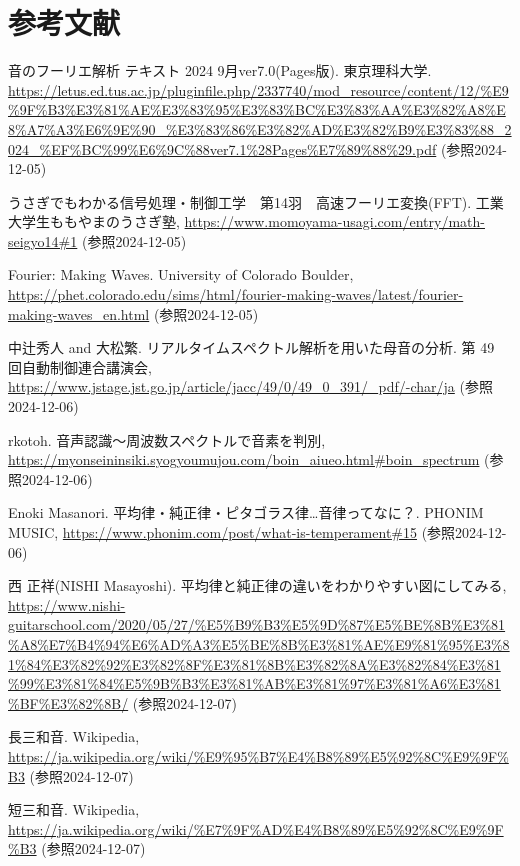 \documentclass{article}
\begin{document}
\section*{参考文献}
\begin{spacing}{1.4}
    \noindent
    [1] 音のフーリエ解析 テキスト 2024 9月ver7.0(Pages版). 東京理科大学.
    \url{https://letus.ed.tus.ac.jp/pluginfile.php/2337740/mod_resource/content/12/%E9%9F%B3%E3%81%AE%E3%83%95%E3%83%BC%E3%83%AA%E3%82%A8%E8%A7%A3%E6%9E%90_%E3%83%86%E3%82%AD%E3%82%B9%E3%83%88_2024_%EF%BC%99%E6%9C%88ver7.1%28Pages%E7%89%88%29.pdf}
    (参照2024-12-05)

    \noindent
    [2] うさぎでもわかる信号処理・制御工学　第14羽　高速フーリエ変換(FFT). 工業大学生ももやまのうさぎ塾,  
    \url{https://www.momoyama-usagi.com/entry/math-seigyo14#1}
    (参照2024-12-05)

    \noindent
    [3] Fourier: Making Waves. 
    University of Colorado Boulder,
    \url{https://phet.colorado.edu/sims/html/fourier-making-waves/latest/fourier-making-waves_en.html}
    (参照2024-12-05)

    \noindent
    [4] 中辻秀人 and 大松繁. リアルタイムスペクトル解析を用いた母音の分析. 第 49 回自動制御連合講演会,
    \url{https://www.jstage.jst.go.jp/article/jacc/49/0/49_0_391/_pdf/-char/ja}
    (参照2024-12-06)

    \noindent
    [5] rkotoh. 音声認識～周波数スペクトルで音素を判別, 
    \url{https://myonseininsiki.syogyoumujou.com/boin_aiueo.html#boin_spectrum}
    (参照2024-12-06)

    \noindent
    [6] Enoki Masanori. 平均律・純正律・ピタゴラス律…音律ってなに？. PHONIM MUSIC, 
    \url{https://www.phonim.com/post/what-is-temperament#15}
    (参照2024-12-06)

    \noindent
    [7] 西 正祥(NISHI Masayoshi). 平均律と純正律の違いをわかりやすい図にしてみる, 
    \url{https://www.nishi-guitarschool.com/2020/05/27/%E5%B9%B3%E5%9D%87%E5%BE%8B%E3%81%A8%E7%B4%94%E6%AD%A3%E5%BE%8B%E3%81%AE%E9%81%95%E3%81%84%E3%82%92%E3%82%8F%E3%81%8B%E3%82%8A%E3%82%84%E3%81%99%E3%81%84%E5%9B%B3%E3%81%AB%E3%81%97%E3%81%A6%E3%81%BF%E3%82%8B/}
    (参照2024-12-07)

    \noindent
    [8] 長三和音. Wikipedia, 
    \url{https://ja.wikipedia.org/wiki/%E9%95%B7%E4%B8%89%E5%92%8C%E9%9F%B3}
    (参照2024-12-07)

    \noindent
    [9] 短三和音. Wikipedia, 
    \url{https://ja.wikipedia.org/wiki/%E7%9F%AD%E4%B8%89%E5%92%8C%E9%9F%B3}
    (参照2024-12-07)


\end{spacing}
\end{document}
